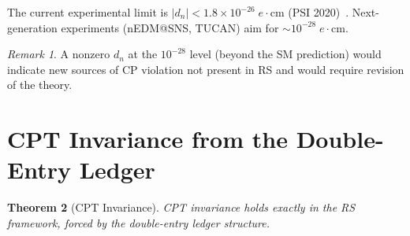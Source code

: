 \documentclass[12pt,a4paper]{article}
\newtheorem{theorem}{Theorem}[section]
\theoremstyle{definition}
\theoremstyle{remark}
\newtheorem{remark}[theorem]{Remark}
\begin{document}
The current experimental limit is
$|d_n| < 1.8 \times 10^{-26}\;e\cdot\mathrm{cm}$
(PSI 2020)~\cite{nEDM}.  Next-generation experiments
(nEDM@SNS, TUCAN) aim for
$\sim 10^{-28}\;e\cdot\mathrm{cm}$.

\begin{remark}
A nonzero $d_n$ at the $10^{-28}$ level (beyond the SM
prediction) would indicate new sources of CP violation not
present in RS and would require revision of the theory.
\end{remark}

\section{CPT Invariance from the Double-Entry Ledger}
\label{sec:cpt}

\begin{theorem}[CPT Invariance]
\label{thm:cpt}
CPT invariance holds exactly in the RS framework, forced by the
double-entry ledger structure.
\end{theorem}
\end{document}
